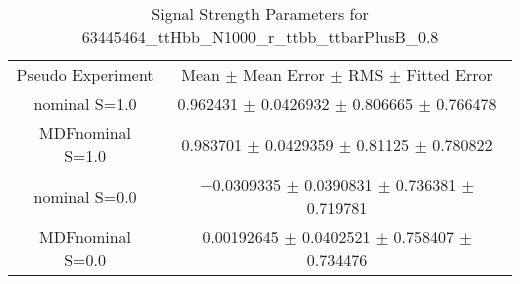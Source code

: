 \begin{table}
\centering
\caption{Signal Strength Parameters for 63445464\_ttHbb\_N1000\_r\_ttbb\_ttbarPlusB\_0.8}
\begin{tabular}{cc}
\toprule
Pseudo Experiment & Mean $\pm$ Mean Error $\pm$ RMS $\pm$ Fitted Error\\
nominal S=1.0 & \num{0.962431} $\pm$ \num{0.0426932} $\pm$ \num{0.806665} $\pm$ \num{0.766478}\\
MDFnominal S=1.0 & \num{0.983701} $\pm$ \num{0.0429359} $\pm$ \num{0.81125} $\pm$ \num{0.780822}\\
nominal S=0.0 & \num{-0.0309335} $\pm$ \num{0.0390831} $\pm$ \num{0.736381} $\pm$ \num{0.719781}\\
MDFnominal S=0.0 & \num{0.00192645} $\pm$ \num{0.0402521} $\pm$ \num{0.758407} $\pm$ \num{0.734476}\\
\bottomrule
\end{tabular}
\end{table}
